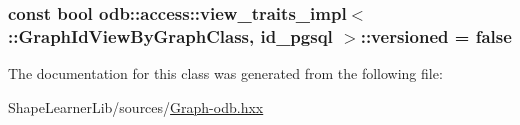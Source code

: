 \subsubsection[{versioned}]{\setlength{\rightskip}{0pt plus 5cm}const bool odb\+::access\+::view\+\_\+traits\+\_\+impl$<$ \+::{\bf Graph\+Id\+View\+By\+Graph\+Class}, id\+\_\+pgsql $>$\+::versioned = false\hspace{0.3cm}{\ttfamily [static]}}\label{classodb_1_1access_1_1view__traits__impl_3_01_1_1_graph_id_view_by_graph_class_00_01id__pgsql_01_4_a6764b273ad57a6b485455207dce0e7a5}


The documentation for this class was generated from the following file\+:\begin{DoxyCompactItemize}
\item 
Shape\+Learner\+Lib/sources/\hyperlink{_graph-odb_8hxx}{Graph-\/odb.\+hxx}\end{DoxyCompactItemize}
